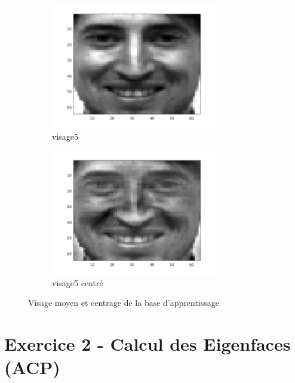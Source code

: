 \documentclass[a4paper]{article}
\begin{document}
\begin{figure}[H]
    \begin{subfigure}[c]{0.24\textwidth}
        \centering
        \includegraphics[width=0.8\textwidth]{images/ex1_x5.png}
        \caption{visage5}
        \label{subfig:ex1_x5}
    \end{subfigure}
    \begin{subfigure}[c]{0.24\textwidth}
        \centering
        \includegraphics[width=0.8\textwidth]{images/ex1_x5c.png}
        \caption{visage5 centré}
        \label{subfig:ex1_x5c}
    \end{subfigure}
    
    \caption{Visage moyen et centrage de la base d'apprentissage} 
    \label{fig:ex1}
\end{figure}

\newpage

\section*{Exercice 2 - Calcul des Eigenfaces (ACP)}
\end{document}

